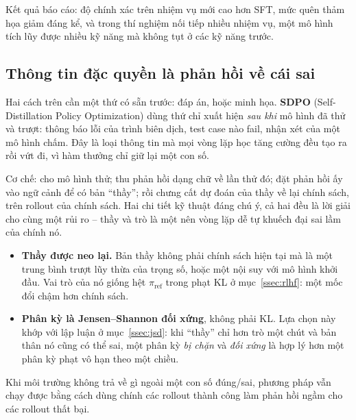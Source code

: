 Kết quả báo cáo: độ chính xác trên nhiệm vụ mới cao hơn SFT, mức quên thảm họa giảm đáng kể, và trong thí nghiệm nối tiếp nhiều nhiệm vụ, một mô hình tích lũy được nhiều kỹ năng mà không tụt ở các kỹ năng trước.

\subsection{Thông tin đặc quyền là phản hồi về cái sai}
\label{ssec:sdpo}

Hai cách trên cần một thứ có sẵn trước: đáp án, hoặc minh họa. \textbf{SDPO} (Self-Distillation Policy Optimization) \cite{huebotter2026sdpo} dùng thứ chỉ xuất hiện \emph{sau khi} mô hình đã thử và trượt: thông báo lỗi của trình biên dịch, test case nào fail, nhận xét của một mô hình chấm. Đây là loại thông tin mà mọi vòng lặp học tăng cường đều tạo ra rồi vứt đi, vì hàm thưởng chỉ giữ lại một con số.

Cơ chế: cho mô hình thử; thu phản hồi dạng chữ về lần thử đó; đặt phản hồi ấy vào ngữ cảnh để có bản ``thầy''; rồi chưng cất dự đoán của thầy về lại chính sách, trên rollout của chính sách. Hai chi tiết kỹ thuật đáng chú ý, cả hai đều là lời giải cho cùng một rủi ro -- thầy và trò là một nên vòng lặp dễ tự khuếch đại sai lầm của chính nó.

\begin{itemize}
	\item \textbf{Thầy được neo lại.} Bản thầy không phải chính sách hiện tại mà là một trung bình trượt lũy thừa của trọng số, hoặc một nội suy với mô hình khởi đầu. Vai trò của nó giống hệt $\pi_{\text{ref}}$ trong phạt KL ở mục~\ref{ssec:rlhf}: một mốc đổi chậm hơn chính sách.
	\item \textbf{Phân kỳ là Jensen--Shannon đối xứng}, không phải KL. Lựa chọn này khớp với lập luận ở mục~\ref{ssec:jsd}: khi ``thầy'' chỉ hơn trò một chút và bản thân nó cũng có thể sai, một phân kỳ \emph{bị chặn} và \emph{đối xứng} là hợp lý hơn một phân kỳ phạt vô hạn theo một chiều.
\end{itemize}

Khi môi trường không trả về gì ngoài một con số đúng/sai, phương pháp vẫn chạy được bằng cách dùng chính các rollout thành công làm phản hồi ngầm cho các rollout thất bại.

